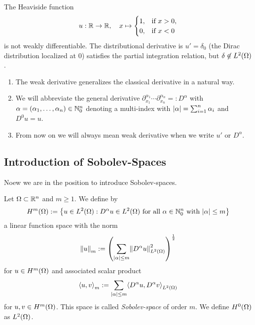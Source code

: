 \begin{example}
	The Heaviside function
	\[
		u: \R \to \R, \quad x \mapsto \begin{cases}
			1, & \text{if }x > 0,\\
			0, & \text{if }x < 0
		\end{cases}
	\]
	is not weakly differentiable.
	The distributional derivative is \(u' = \delta_0\) (the Dirac distribution localized at \(0\)) satisfies the partial integration relation, but \(\delta \not\in L^2\parentheses*{\Omega}\).
\end{example}

\begin{remark}
	\begin{enumerate}
		\item The weak derivative generalizes the classical derivative in a natural way.
		\item We will abbreviate the general derivative \(\partial_{x_1}^{\alpha_1}\cdots\partial_{x_n}^{\alpha_n} =: D^\alpha\) with \(\alpha = \parentheses*{\alpha_1, \ldots, \alpha_n} \in \N_0^n\) denoting a multi-index with \(\absolute*{\alpha} = \sum_{i = 1}^n \alpha_i\) and \(D^0 u = u\).
		\item From now on we will always mean weak derivative when we write \(u'\) or \(D^\alpha\).
	\end{enumerate}
\end{remark}


\subsection{Introduction of Sobolev-Spaces}

Noew we are in the position to introduce Sobolev-spaces.

\begin{definition}
	Let \(\Omega \subset \R^n\) and \(m \ge 1\).
	We define by
	\[
		H^m\parentheses*{\Omega} := \braces*{u \in L^2\parentheses*{\Omega} : D^\alpha u \in L^2\parentheses*{\Omega}\text{ for all }\alpha \in \N_0^n\text{ with }\absolute*{\alpha} \le m}
	\]
	a linear function space with the norm
	\[
		\norm*{u}_m := \parentheses*{\sum_{\absolute*{\alpha} \le m}\norm*{D^\alpha u}_{L^2\parentheses*{\Omega}}^2}^{\frac{1}{2}}
	\]
	for \(u \in H^m\parentheses*{\Omega}\) and associated scalar product
	\[
		\angles*{u, v}_m := \sum_{\absolute*{\alpha} \le m}\angles*{D^\alpha u, D^\alpha v}_{L^2\parentheses*{\Omega}}
	\]
	for \(u, v \in H^m\parentheses*{\Omega}\).
	This space is called \emph{Sobolev-space} of order \(m\).
	We define \(H^0\parentheses*{\Omega}\) as \(L^2\parentheses*{\Omega}\).
\end{definition}

